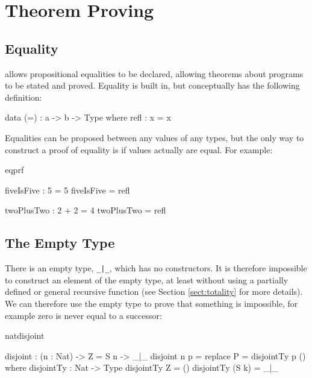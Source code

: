 \section{Theorem Proving}

\subsection{Equality}

\Idris{} allows propositional equalities to be declared, allowing theorems about
programs to be stated and proved. Equality is built in, but conceptually has
the following definition:

\begin{SaveVerbatim}{}

data (=) : a -> b -> Type where
   refl : x = x

\end{SaveVerbatim}
\useverb{}

\noindent
Equalities can be proposed between any values of any types, but the only way to
construct a proof of equality is if values actually are equal. For example:

\begin{SaveVerbatim}{eqprf}

fiveIsFive : 5 = 5
fiveIsFive = refl

twoPlusTwo : 2 + 2 = 4
twoPlusTwo = refl

\end{SaveVerbatim}

\subsection{The Empty Type}

\label{sect:empty}

There is an empty type, \texttt{\_|\_}, which has no constructors. It is
therefore impossible to construct an element of the empty type, at least
without using a partially defined or general recursive function (see Section
\ref{sect:totality} for more details). We can therefore use the empty type
to prove that something is impossible, for example zero is never equal
to a successor:

\begin{SaveVerbatim}{natdisjoint}

disjoint : (n : Nat) -> Z = S n -> _|_
disjoint n p = replace {P = disjointTy} p ()
  where
    disjointTy : Nat -> Type
    disjointTy Z = ()
    disjointTy (S k) = _|_

\end{SaveVerbatim}

